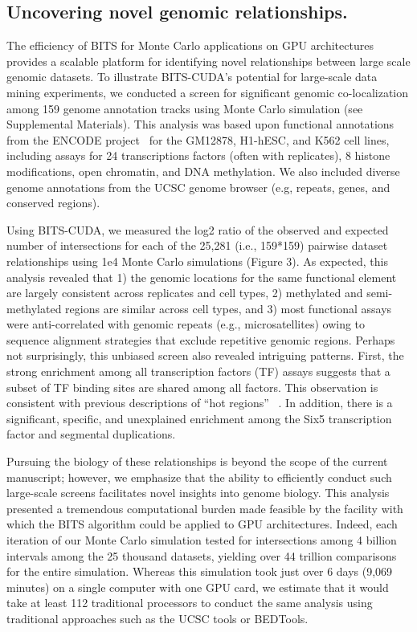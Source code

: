 \documentclass{bioinfo}
\begin{document}
\vspace{-2em}
\subsection{Uncovering novel genomic relationships.}
\label{hm:section}
The efficiency of BITS for Monte Carlo applications on GPU architectures
provides a scalable platform for identifying novel relationships between
large scale genomic datasets. To illustrate BITS-CUDA's potential
for large-scale data mining experiments, 
we conducted a screen for significant genomic co-localization among
159 genome annotation tracks using Monte Carlo simulation (see
Supplemental Materials). This analysis was based upon functional annotations 
from the ENCODE project~\citep{encode2007} for the GM12878, H1-hESC, and K562 
cell lines, including assays for 24 transcriptions factors 
(often with replicates), 8 histone
modifications, open chromatin, and DNA methylation. We also included diverse 
genome annotations from the UCSC genome browser (e.g, repeats, 
genes, and conserved regions).

Using BITS-CUDA, we measured the log2 ratio of the observed and expected number
of intersections for each of the 25,281 (i.e., 159*159) pairwise 
dataset relationships using 1e4 Monte Carlo simulations (Figure 3).
As expected, this analysis revealed that 1) the genomic locations 
for the same functional element are largely consistent across 
replicates and cell types, 2) methylated and semi-methylated regions
are similar across cell types, and 3) most functional assays were
anti-correlated with genomic repeats (e.g., microsatellites)
owing to sequence alignment strategies that exclude repetitive genomic
regions. Perhaps not surprisingly, this unbiased screen also revealed
intriguing patterns.  First, the strong enrichment among all
transcription factors (TF) assays suggests that a subset of TF
binding sites are shared among all factors. This observation is 
consistent with previous descriptions of ``hot regions''
~\citep{gerstein2010}. In addition, there is a significant, 
specific, and unexplained enrichment among the Six5 transcription factor
and segmental duplications. 

Pursuing the biology of these relationships is beyond the 
scope of the current manuscript; however, we emphasize that the ability 
to efficiently conduct such large-scale screens facilitates novel 
insights into genome biology. This analysis presented a tremendous
computational burden made feasible by the facility with which
the BITS algorithm could be applied to GPU architectures. Indeed, each
iteration of our Monte Carlo simulation tested for
intersections among 4 billion intervals among the 25 thousand datasets,
yielding over 44 trillion comparisons for the entire simulation. Whereas
this simulation took just over 6 days (9,069 minutes) on a single
computer with one GPU card, we estimate that it would take at least 
112 traditional processors to conduct the same analysis using 
traditional approaches such as the UCSC tools or BEDTools.
\end{document}
